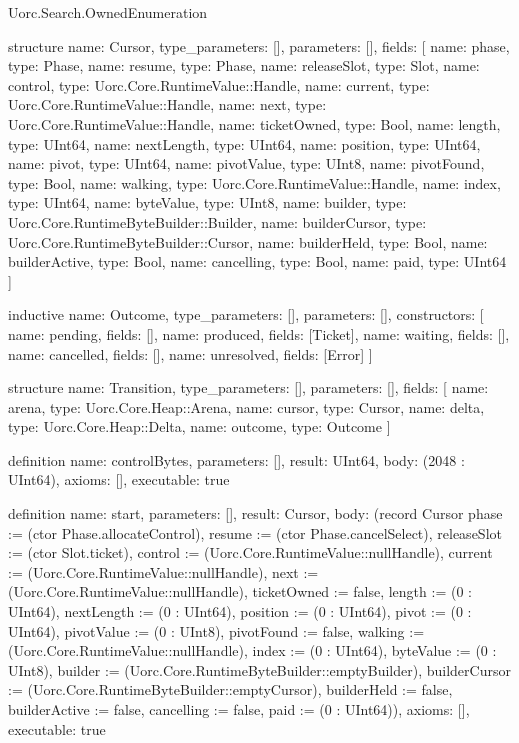 \begin{lexlean}{Uorc.Search.OwnedEnumeration}
\begin{semanticmodule}
structure{
  name: Cursor,
  type_parameters: [],
  parameters: [],
  fields: [
    {name: phase, type: Phase},
    {name: resume, type: Phase},
    {name: releaseSlot, type: Slot},
    {name: control, type: Uorc.Core.RuntimeValue::Handle},
    {name: current, type: Uorc.Core.RuntimeValue::Handle},
    {name: next, type: Uorc.Core.RuntimeValue::Handle},
    {name: ticketOwned, type: Bool},
    {name: length, type: UInt64},
    {name: nextLength, type: UInt64},
    {name: position, type: UInt64},
    {name: pivot, type: UInt64},
    {name: pivotValue, type: UInt8},
    {name: pivotFound, type: Bool},
    {name: walking, type: Uorc.Core.RuntimeValue::Handle},
    {name: index, type: UInt64},
    {name: byteValue, type: UInt8},
    {name: builder, type: Uorc.Core.RuntimeByteBuilder::Builder},
    {name: builderCursor, type: Uorc.Core.RuntimeByteBuilder::Cursor},
    {name: builderHeld, type: Bool},
    {name: builderActive, type: Bool},
    {name: cancelling, type: Bool},
    {name: paid, type: UInt64}
  ]
}

inductive{
  name: Outcome,
  type_parameters: [],
  parameters: [],
  constructors: [
    {name: pending, fields: []},
    {name: produced, fields: [Ticket]},
    {name: waiting, fields: []},
    {name: cancelled, fields: []},
    {name: unresolved, fields: [Error]}
  ]
}

structure{
  name: Transition,
  type_parameters: [],
  parameters: [],
  fields: [
    {name: arena, type: Uorc.Core.Heap::Arena},
    {name: cursor, type: Cursor},
    {name: delta, type: Uorc.Core.Heap::Delta},
    {name: outcome, type: Outcome}
  ]
}

definition{
  name: controlBytes,
  parameters: [],
  result: UInt64,
  body: (2048 : UInt64),
  axioms: [],
  executable: true
}

definition{
  name: start,
  parameters: [],
  result: Cursor,
  body: (record Cursor {phase := (ctor Phase.allocateControl), resume := (ctor Phase.cancelSelect), releaseSlot := (ctor Slot.ticket), control := (Uorc.Core.RuntimeValue::nullHandle), current := (Uorc.Core.RuntimeValue::nullHandle), next := (Uorc.Core.RuntimeValue::nullHandle), ticketOwned := false, length := (0 : UInt64), nextLength := (0 : UInt64), position := (0 : UInt64), pivot := (0 : UInt64), pivotValue := (0 : UInt8), pivotFound := false, walking := (Uorc.Core.RuntimeValue::nullHandle), index := (0 : UInt64), byteValue := (0 : UInt8), builder := (Uorc.Core.RuntimeByteBuilder::emptyBuilder), builderCursor := (Uorc.Core.RuntimeByteBuilder::emptyCursor), builderHeld := false, builderActive := false, cancelling := false, paid := (0 : UInt64)}),
  axioms: [],
  executable: true
}


\end{semanticmodule}
\end{lexlean}

